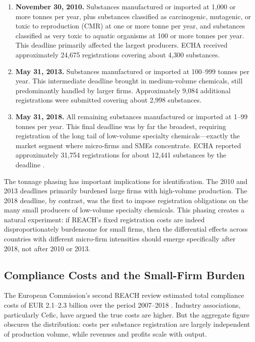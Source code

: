 \documentclass[12pt]{article}
\begin{document}
\begin{enumerate}
\item \textbf{November 30, 2010.} Substances manufactured or imported at 1,000 or more tonnes per year, plus substances classified as carcinogenic, mutagenic, or toxic to reproduction (CMR) at one or more tonne per year, and substances classified as very toxic to aquatic organisms at 100 or more tonnes per year. This deadline primarily affected the largest producers. ECHA received approximately 24,675 registrations covering about 4,300 substances.

\item \textbf{May 31, 2013.} Substances manufactured or imported at 100--999 tonnes per year. This intermediate deadline brought in medium-volume chemicals, still predominantly handled by larger firms. Approximately 9,084 additional registrations were submitted covering about 2,998 substances.

\item \textbf{May 31, 2018.} All remaining substances manufactured or imported at 1--99 tonnes per year. This final deadline was by far the broadest, requiring registration of the long tail of low-volume specialty chemicals---exactly the market segment where micro-firms and SMEs concentrate. ECHA reported approximately 31,754 registrations for about 12,441 substances by the deadline \citep{echareach2020}.
\end{enumerate}

The tonnage phasing has important implications for identification. The 2010 and 2013 deadlines primarily burdened large firms with high-volume production. The 2018 deadline, by contrast, was the first to impose registration obligations on the many small producers of low-volume specialty chemicals. This phasing creates a natural experiment: if REACH's fixed registration costs are indeed disproportionately burdensome for small firms, then the differential effects across countries with different micro-firm intensities should emerge specifically after 2018, not after 2010 or 2013.

\subsection{Compliance Costs and the Small-Firm Burden}

The European Commission's second REACH review estimated total compliance costs of EUR 2.1--2.3 billion over the period 2007--2018 \citep{ec2018impact}. Industry associations, particularly Cefic, have argued the true costs are higher. But the aggregate figure obscures the distribution: costs per substance registration are largely independent of production volume, while revenues and profits scale with output.
\end{document}
